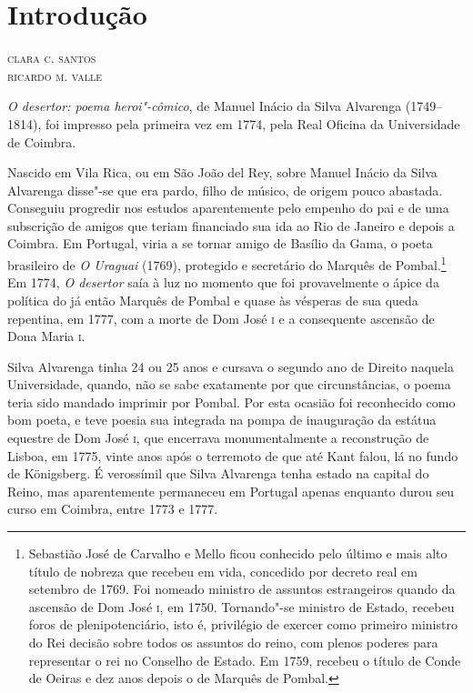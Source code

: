 \chapter[Introdução, \emph{por Clara S. Santos e Ricardo M. Valle}]{Introdução}

\begin{flushright}
\textsc{clara c. santos\\ricardo m. valle}
\end{flushright}

\textit{O desertor: poema heroi"-cômico}, de Manuel Inácio
da Silva Alvarenga (1749--1814), foi impresso pela primeira
vez em 1774, pela Real Oficina da Universidade de Coimbra.

Nascido em Vila Rica, ou em São João del Rey, sobre Manuel Inácio da Silva
Alvarenga disse"-se que era pardo, filho de músico, de origem pouco abastada.
Conseguiu progredir nos estudos aparentemente pelo empenho do pai e de uma
subscrição de amigos que teriam financiado sua ida ao Rio de Janeiro e depois a
Coimbra. Em Portugal, viria a se tornar amigo de Basílio da Gama, o poeta
brasileiro de \textit{O Uraguai} (1769), protegido e secretário do Marquês de
Pombal.\footnote{  Sebastião José de Carvalho e Mello ficou conhecido pelo último
e mais alto título de nobreza que recebeu em vida, concedido por decreto real em
setembro de 1769. Foi nomeado ministro de assuntos estrangeiros quando da
ascensão de Dom José \textsc{i}, em 1750. Tornando"-se ministro de Estado,
recebeu foros de plenipotenciário, isto é, privilégio de exercer como primeiro
ministro do Rei decisão sobre todos os assuntos do reino, com plenos poderes
para representar o rei no Conselho de Estado. Em 1759, recebeu o título de Conde
de Oeiras e dez anos depois o de Marquês de Pombal. }  Em 1774, \textit{O
desertor} saía à luz no momento que foi provavelmente o ápice da política do já
então Marquês de Pombal e quase às vésperas de sua queda repentina, em 1777, com
a morte de Dom José \textsc{i} e a consequente ascensão de Dona Maria
\textsc{i}.

Silva Alvarenga tinha 24 ou 25 anos e cursava o segundo ano de Direito naquela
Universidade, quando, não se sabe exatamente por que circunstâncias, o poema
teria sido mandado imprimir por Pombal. Por esta ocasião foi reconhecido como
bom poeta, e teve poesia sua integrada na pompa de inauguração da estátua
equestre de Dom José \textsc{i}, que encerrava monumentalmente a reconstrução de
Lisboa, em 1775, vinte anos após o terremoto de que até Kant falou, lá no fundo
de K\"onigsberg.  É verossímil que Silva Alvarenga tenha estado na capital do
Reino, mas aparentemente permaneceu em Portugal apenas enquanto durou seu curso
em Coimbra, entre 1773 e 1777.


